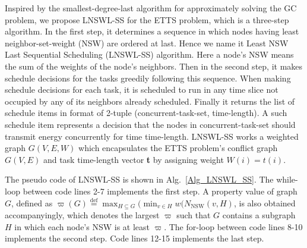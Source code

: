 \documentclass[journal,10pt]{IEEEtran}
\begin{document}
Inspired by the smallest-degree-last algorithm \cite{Marathe1995} for approximately solving the GC problem, we propose LNSWL-SS for the ETTS problem, which is a three-step algorithm. In the first step, it determines a sequence in which nodes having least neighbor-set-weight (NSW) are ordered at last. Hence we name it Least NSW Last Sequential Scheduling (LNSWL-SS) algorithm. Here a node's NSW means the sum of the weights of the node's neighbors. Then in the second step, it makes schedule decisions for the tasks greedily following this sequence. When making schedule decisions for each task, it is scheduled to run in any time slice not occupied by any of its neighbors already scheduled. Finally it returns the list of schedule items in format of 2-tuple (concurrent-task-set, time-length). A such schedule item represents a decision that the nodes in concurrent-task-set should transmit energy concurrently for time time-length. LNSWL-SS works a weighted graph $G(V,E,W)$ which encapsulates the ETTS problem's conflict graph $G(V,E)$ and task time-length vector \textbf{t} by assigning weight $W(i){=}t(i)$.

The pseudo code of LNSWL-SS is shown in Alg.~\ref{Alg_LNSWL_SS}. The while-loop between code lines 2-7 implements the first step. A property value of graph $G$, defined as $\varpi(G){\mathop{=}\limits^{\text{def}}}\max_{H{\subseteq}G}(\min_{v{\in}H}w(N_\text{NSW}(v,H)$, is also obtained accompanyingly, which denotes the largest $\varpi$ such that $G$ contains a subgraph $H$ in which each node's NSW is at least $\varpi$. The for-loop between code lines 8-10 implements the second step. Code lines 12-15 implements the last step.
\end{document}
